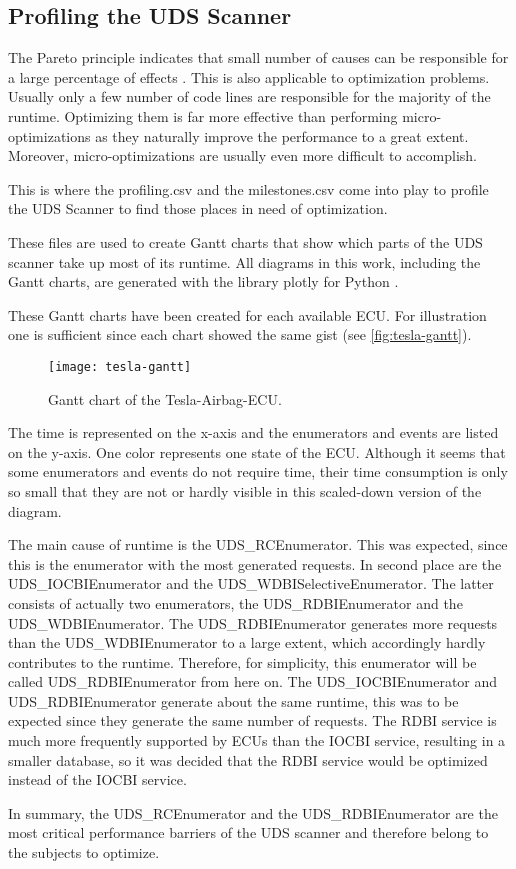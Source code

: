 \subsection{Profiling the UDS Scanner}

The Pareto principle indicates that small number of causes can be responsible for a large percentage of effects \cite{pareto}. This is also applicable to optimization problems. Usually only a few number of code lines are responsible for the majority of the runtime. Optimizing them is far more effective than performing micro-optimizations as they naturally improve the performance to a great extent. Moreover, micro-optimizations are usually even more difficult to accomplish.

This is where the profiling.csv and the milestones.csv come into play to profile the UDS Scanner to find those places in need of optimization.

These files are used to create Gantt charts that show which parts of the UDS scanner take up most of its runtime. All diagrams in this work, including the Gantt charts, are generated with the library plotly for Python \cite{plotly}.

These Gantt charts have been created for each available ECU. For illustration one is sufficient since each chart showed the same gist (see \autoref{fig:tesla-gantt}).

\begin{figure}[h]
    \centering
    \texttt{[image: tesla-gantt]}
    \caption{Gantt chart of the Tesla-Airbag-ECU.}
    \label{fig:tesla-gantt}
\end{figure}

The time is represented on the x-axis and the enumerators and events are listed on the y-axis. One color represents one state of the ECU.
Although it seems that some enumerators and events do not require time, their time consumption is only so small that they are not or hardly visible in this scaled-down version of the diagram.

The main cause of runtime is the UDS\_RCEnumerator. This was expected, since this is the enumerator with the most generated requests. In second place are the UDS\_IOCBIEnumerator and the UDS\_WDBISelectiveEnumerator. The latter consists of actually two enumerators, the UDS\_RDBIEnumerator and the UDS\_WDBIEnumerator. The UDS\_RDBIEnumerator generates more requests than the UDS\_WDBIEnumerator to a large extent, which accordingly hardly contributes to the runtime. Therefore, for simplicity, this enumerator will be called UDS\_RDBIEnumerator from here on.
The UDS\_IOCBIEnumerator and UDS\_RDBIEnumerator generate about the same runtime, this was to be expected since they generate the same number of requests. The RDBI service is much more frequently supported by ECUs than the IOCBI service, resulting in a smaller database, so it was decided that the RDBI service would be optimized instead of the IOCBI service.

In summary, the UDS\_RCEnumerator and the UDS\_RDBIEnumerator are the most critical performance barriers of the UDS scanner and therefore belong to the subjects to optimize.
